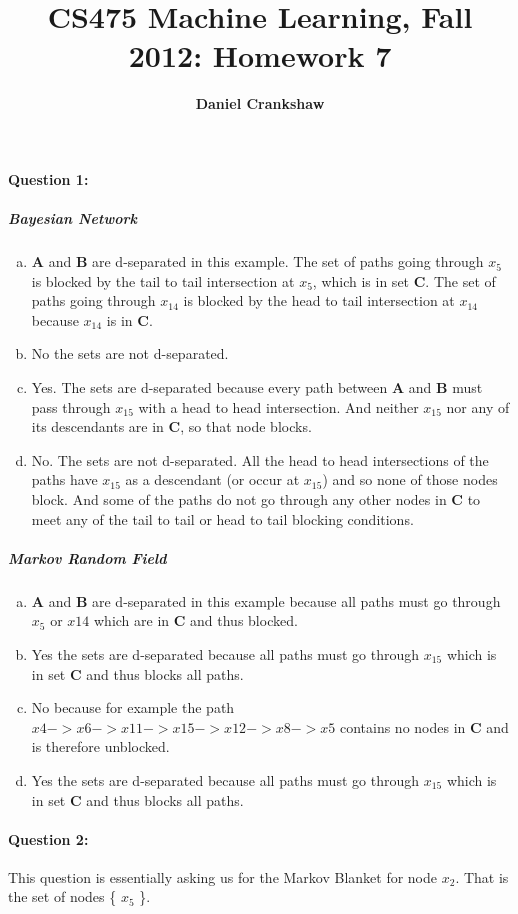 \documentclass[letterpaper,11pt]{article}
\title{CS475 Machine Learning, Fall 2012: Homework 7}
\date{}
\author{\bf Daniel Crankshaw}
\begin{document}
\maketitle

\paragraph{Question 1:}
\subparagraph{Bayesian Network}
\begin{enumerate}[(a)]
\item
    {\bf A} and {\bf B} are d-separated in this example. The set of paths going through $x_5$ is blocked
    by the tail to tail intersection at $x_5$, which is in set {\bf C}. The set of paths going through
    $x_{14}$ is blocked by the head to tail intersection at $x_{14}$ because $x_{14}$ is in {\bf C}.
\item
    No the sets are not d-separated.
\item
    Yes. The sets are d-separated because every path between {\bf A} and {\bf B} must pass through
    $x_{15}$ with a head to head intersection. And neither $x_{15}$ nor any of its descendants are
    in {\bf C}, so that node blocks.
\item
    No. The sets are not d-separated. All the head to head intersections of the paths have $x_{15}$
    as a descendant (or occur at $x_{15}$) and so none of those nodes block. And some of the paths
    do not go through any other nodes in {\bf C} to meet any of the tail to tail or head to tail
    blocking conditions.
\end{enumerate}
\subparagraph{Markov Random Field}
\begin{enumerate}[(a)]
\item
    {\bf A} and {\bf B} are d-separated in this example because all paths must go through
    $x_{5}$ or $x{14}$ which are in {\bf C} and thus blocked.
\item
    Yes the sets are d-separated because all paths must go through $x_{15}$ which is in set {\bf C}
    and thus blocks all paths.
\item
    No because for example the path $x{4} -> x{6} -> x{11} -> x{15} -> x{12} -> x{8} -> x{5}$ contains
    no nodes in {\bf C} and is therefore unblocked.
\item
    Yes the sets are d-separated because all paths must go through $x_{15}$ which is in set {\bf C}
    and thus blocks all paths.
\end{enumerate}

\paragraph{Question 2:}
    This question is essentially asking us for the Markov Blanket for node $x_2$. That is the set of nodes
    \{ $x_5$ \}.
\end{document}
